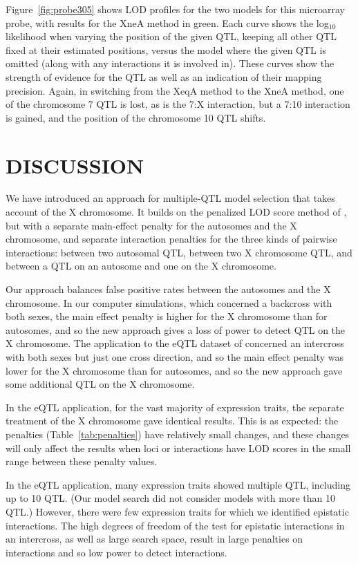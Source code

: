\documentclass[12pt,letterpaper]{article}
\begin{document}
Figure~\ref{fig:probe305} shows LOD profiles for the two models for
this microarray probe, with results for the XneA method in green. Each
curve shows the log$_{10}$ likelihood when varying the position of the
given QTL, keeping all other QTL fixed at their estimated positions,
versus the model where the given QTL is omitted (along with any
interactions it is involved in). These curves show the strength of
evidence for the QTL as well as an indication of their mapping
precision. Again, in switching from the XeqA method to the XneA
method, one of the chromosome 7 QTL is lost, as is the 7:X
interaction, but a 7:10 interaction is gained, and the position of the
chromosome 10 QTL shifts.


\clearpage
\section*{DISCUSSION}

We have introduced an approach for multiple-QTL model selection that
takes account of the X chromosome. It builds on the penalized LOD
score method of \citet{Manichaikul2009}, but with a separate
main-effect penalty for the autosomes and the X chromosome, and
separate interaction penalties for the three kinds of pairwise
interactions: between two autosomal QTL, between two X chromosome QTL,
and between a QTL on an autosome and one on the X chromosome.

Our approach balances false positive rates between the autosomes and
the X chromosome. In our computer simulations, which concerned a
backcross with both sexes, the main effect penalty is higher for the X
chromosome than for autosomes, and so the new approach gives a loss of
power to detect QTL on the X chromosome. The application to the
eQTL dataset of \citet{Tian2016} concerned an intercross with both
sexes but just one cross direction, and so the main effect penalty was
lower for the X chromosome than for autosomes, and so the new approach
gave some additional QTL on the X chromosome.

In the eQTL application, for the vast majority of expression traits,
the separate treatment of the X chromosome gave identical results.
This is as expected: the penalties (Table~\ref{tab:penalties}) have
relatively small changes, and these changes will only affect the
results when loci or interactions have LOD scores in the small range between these
penalty values.

In the eQTL application, many expression traits showed multiple QTL,
including up to 10 QTL. (Our model search did not consider models with
more than 10 QTL.) However, there were few expression traits for which
we identified epistatic interactions. The high degrees of freedom of
the test for epistatic interactions in an intercross, as well as large
search space, result in large penalties on interactions and so low
power to detect interactions.
\end{document}
